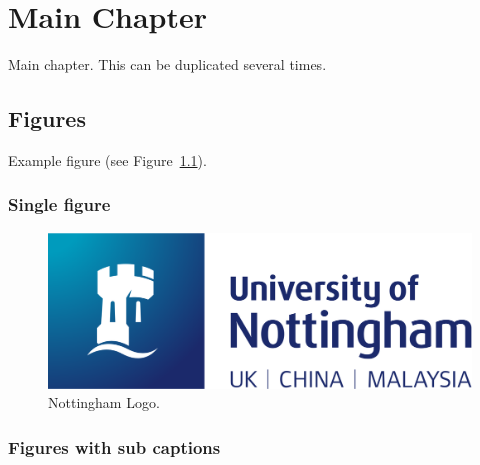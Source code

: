\chapter{Main Chapter}
\label{ch:mainchapter}

Main chapter. This can be duplicated several times.

\newpage
\minitoc %
\newpage

\section{Figures}

Example figure (see Figure~\ref{fig:nottinghamlogo}).

\subsection{Single figure}
\begin{figure}[h]
    \centering
    \includegraphics[width=0.8\columnwidth]{images/nottingham-logo.png}
    \caption{Nottingham Logo.}
    \label{fig:nottinghamlogo}
\end{figure}

\subsection{Figures with sub captions}

